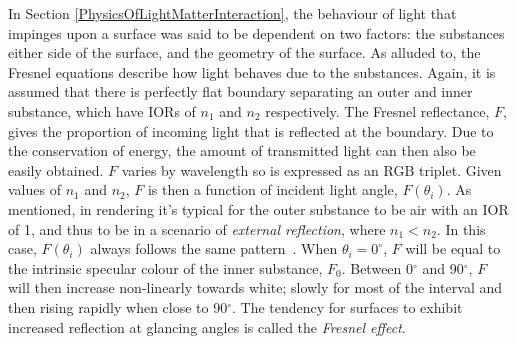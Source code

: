 In Section \ref{PhysicsOfLightMatterInteraction}, the behaviour of light that impinges upon a surface was said to be dependent on two factors: the substances either side of the surface, and the geometry of the surface. As alluded to, the Fresnel equations describe how light behaves due to the substances. Again, it is assumed that there is perfectly flat boundary separating an outer and inner substance, which have IORs of \begin{math}n_1\end{math} and \begin{math}n_2\end{math} respectively. The Fresnel reflectance, \begin{math}F\end{math}, gives the proportion of incoming light that is reflected at the boundary. Due to the conservation of energy, the amount of transmitted light can then also be easily obtained. \begin{math}F\end{math} varies by wavelength so is expressed as an RGB triplet. Given values of \begin{math}n_1\end{math} and \begin{math}n_2\end{math}, \begin{math}F\end{math} is then a function of incident light angle, \begin{math}F(\theta_i)\end{math}. As mentioned, in rendering it's typical for the outer substance to be air with an IOR of 1, and thus to be in a scenario of \textit{external reflection}, where \begin{math}n_1 < n_2\end{math}. In this case, \begin{math}F(\theta_i)\end{math} always follows the same pattern~\cite{RTR4}. When \begin{math}\theta_i = 0^\circ\end{math}, \begin{math}F\end{math} will be equal to the intrinsic specular colour of the inner substance, \begin{math}F_0\end{math}. Between 0$^{\circ}$ and 90$^{\circ}$, \begin{math}F\end{math} will then increase non-linearly towards white; slowly for most of the interval and then rising rapidly when close to 90$^{\circ}$. The tendency for surfaces to exhibit increased reflection at glancing angles is called the \textit{Fresnel effect}.

